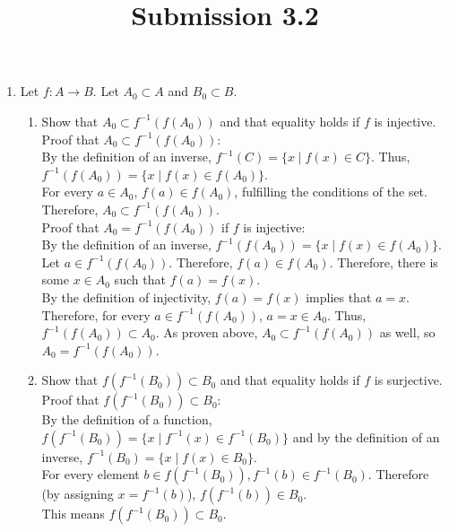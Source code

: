 \documentclass{article}
\title{Submission 3.2}
\date{}
\begin{document}
\maketitle
\begin{enumerate}
      \item Let $f:A \to B$. Let $A_{0} \subset A$ and $B_{0} \subset B$.
            \begin{enumerate}
                  \item Show that $A_{0} \subset f^{-1}(f(A_{0}))$ and that equality holds if $f$ is injective.\\

                        Proof that $A_{0} \subset f^{-1}(f(A_{0}))$:\\
                        By the definition of an inverse, $f^{-1}(C) = \{x \mid f(x) \in C\}$. Thus, $f^{-1}(f(A_{0})) = \{x \mid f(x) \in f(A_{0})\}$.\\
                        For every $a \in A_{0}$, $f(a) \in f(A_{0})$, fulfilling the conditions of the set.\\
                        Therefore, $A_{0} \subset f^{-1}(f(A_{0}))$.\\

                        Proof that $A_{0} = f^{-1}(f(A_{0}))$ if $f$ is injective:\\
                        By the definition of an inverse, $f^{-1}(f(A_{0})) = \{x \mid f(x) \in f(A_{0})\}$.\\
                        Let $a \in f^{-1}(f(A_{0}))$. Therefore, $f(a) \in f(A_{0})$. Therefore, there is some $x \in A_{0}$ such that $f(a) = f(x)$.\\
                        By the definition of injectivity, $f(a) = f(x)$ implies that $a = x$.\\
                        Therefore, for every $a \in f^{-1}(f(A_{0}))$, $a = x \in A_{0}$. Thus, $f^{-1}(f(A_{0})) \subset A_{0}$. As proven above, $A_{0} \subset f^{-1}(f(A_{0}))$ as well, so $A_{0} = f^{-1}(f(A_{0}))$.

                  \item Show that $f(f^{-1}(B_{0})) \subset B_{0}$ and that equality holds if $f$ is surjective.\\

                        Proof that $f(f^{-1}(B_{0})) \subset B_{0}$:\\
                        By the definition of a function, $f(f^{-1}(B_{0})) = \{x \mid f^{-1}(x) \in f^{-1}(B_{0})\}$ and by the definition of an inverse, $f^{-1}(B_{0}) = \{x \mid f(x) \in B_{0}\}$.\\
                        For every element $b \in f(f^{-1}(B_{0})), f^{-1}(b) \in f^{-1}(B_{0})$. Therefore (by assigning $x = f^{-1}(b)$), $f(f^{-1}(b)) \in B_{0}$.\\
                        This means $f(f^{-1}(B_{0})) \subset B_{0}$.\\


\end{enumerate}
\end{enumerate}
\end{document}
